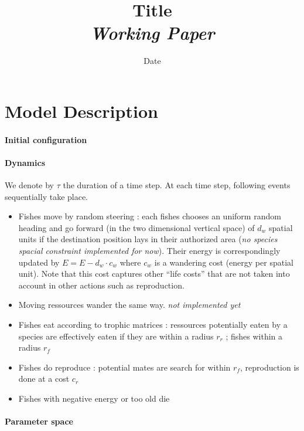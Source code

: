 


\title{Title\bigskip\\
\textit{Working Paper}
}
\author{}
\date{Date}


\maketitle

\justify


\begin{abstract}

\end{abstract}





\section*{Model Description}

\paragraph{Initial configuration}



\paragraph{Dynamics}

We denote by $\tau$ the duration of a time step. At each time step, following events sequentially take place.

\begin{itemize}
\item Fishes move by random steering : each fishes chooses an uniform random heading and go forward (in the two dimensional vertical space) of $d_w$ spatial units if the destination position lays in their authorized area (\textit{no species spacial constraint implemented for now}). Their energy is correspondingly updated by $E=E - d_w \cdot c_w$ where $c_w$ is a wandering cost (energy per spatial unit). Note that this cost captures other ``life costs'' that are not taken into account in other actions such as reproduction.
\item Moving ressources wander the same way. \textit{not implemented yet}
\item Fishes eat according to trophic matrices : ressources potentially eaten by a species are effectively eaten if they are within a radius $r_r$ ; fishes within a radius $r_f$
\item Fishes do reproduce : potential mates are search for within $r_f$, reproduction is done at a cost $c_r$
\item Fishes with negative energy or too old die 
\end{itemize}





\paragraph{Parameter space}












